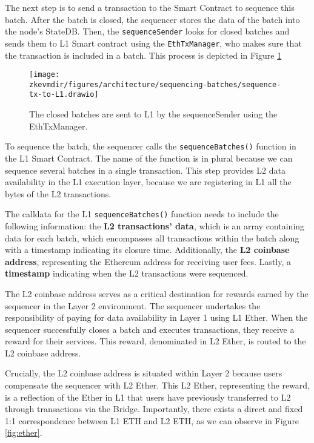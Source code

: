 The next step is to send a transaction to the Smart Contract to sequence this batch. After the batch is closed, the sequencer stores the data of the batch into the node's StateDB. Then, the \texttt{sequenceSender} looks for closed batches and sends them to L1 Smart contract using the \texttt{EthTxManager}, who makes sure that the transaction is included in a batch. This process is depicted in Figure \ref{fig:seq-tx-L1}

\begin{figure}[H]
\centering
\texttt{[image: \\zkevmdir/figures/architecture/sequencing-batches/sequence-tx-to-L1.drawio]}
\caption{The closed batches are sent to L1 by the sequenceSender using the EthTxManager.}
\label{fig:seq-tx-L1}
\end{figure} 

To sequence the batch, the sequencer calls the \texttt{sequenceBatches()} function in the L1 Smart Contract. The name of the function is in plural because we can sequence several batches in a single transaction. This step provides L2 data availability in the L1 execution layer, because we are registering in L1 all the bytes of the L2 transactions.

The calldata for the L1 \texttt{sequenceBatches()} function needs to include the following information: the \textbf{L2 transactions' data}, which is an array containing data for each batch, which encompasses all transactions within the batch along with a timestamp indicating its closure time. Additionally, the \textbf{L2 coinbase address}, representing the Ethereum address for receiving user fees. Lastly, a \textbf{timestamp} indicating when the L2 transactions were sequenced.

The L2 coinbase address serves as a critical destination for rewards earned by the sequencer in the Layer 2 environment. The sequencer undertakes the responsibility of paying for data availability in Layer 1 using L1 Ether. When the sequencer successfully closes a batch and executes transactions, they receive a reward for their services. This reward, denominated in L2 Ether, is routed to the L2 coinbase address.

Crucially, the L2 coinbase address is situated within Layer 2 because users compensate the sequencer with L2 Ether. This L2 Ether, representing the reward, is a reflection of the Ether in L1 that users have previously transferred to L2 through transactions via the Bridge. Importantly, there exists a direct and fixed 1:1 correspondence between L1 ETH and L2 ETH, as we can observe in Figure \ref{fig:ether}.


